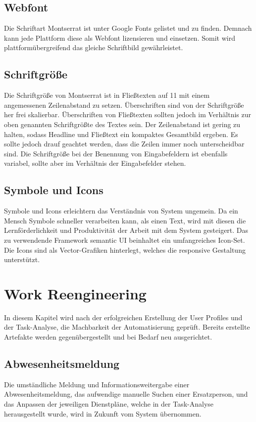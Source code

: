 \documentclass[11pt,
paper=a4,
bibtotocnumbered,	  %
liststotocnumbered,  %
DIV=calc,		  %
tablecaptionabove,	  %
headinclude,
]{article}
\begin{document}
\subsection{Webfont}
Die Schriftart Montserrat ist unter Google Fonts gelistet und zu finden. Demnach kann jede Plattform diese als Webfont lizensieren und einsetzen. Somit wird plattformübergreifend das gleiche Schriftbild gewährleistet.
\subsection{Schriftgröße}
Die Schriftgröße von Montserrat ist in Fließtexten auf 11 mit einem angemessenen Zeilenabstand zu setzen. Überschriften sind von der Schriftgröße her frei skalierbar. Überschriften von Fließtexten sollten jedoch im Verhältnis zur oben genannten Schriftgrößte des Textes sein. Der Zeilenabstand ist gering zu halten, sodass Headline und Fließtext ein kompaktes Gesamtbild ergeben. Es sollte jedoch drauf geachtet werden, dass die Zeilen immer noch unterscheidbar sind. Die Schriftgröße bei der Benennung von Eingabefeldern ist ebenfalls variabel, sollte aber im Verhältnis der Eingabefelder stehen.
\subsection{Symbole und Icons}
Symbole und Icons erleichtern das Verständnis von System ungemein. Da ein Mensch Symbole schneller verarbeiten kann, als einen Text, wird mit diesen die Lernförderlichkeit und Produktivität der Arbeit mit dem System gesteigert. Das zu verwendende Framework semantic UI beinhaltet ein umfangreiches Icon-Set. Die Icons sind als Vector-Grafiken hinterlegt, welches die responsive Gestaltung unterstützt.
\section{Work Reengineering}
In diesem Kapitel wird nach der erfolgreichen Erstellung der User Profiles und der Task-Analyse, die Machbarkeit der Automatisierung geprüft. Bereits erstellte Artefakte werden gegenübergestellt und bei Bedarf neu ausgerichtet.
\subsection{Abwesenheitsmeldung}
Die umständliche Meldung und Informationsweitergabe einer Abwesenheitsmeldung, das aufwendige manuelle Suchen einer Ersatzperson, und das Anpassen der jeweiligen Dienstpläne, welche in der Task-Analyse herausgestellt wurde, wird in Zukunft vom System übernommen.
\end{document}
